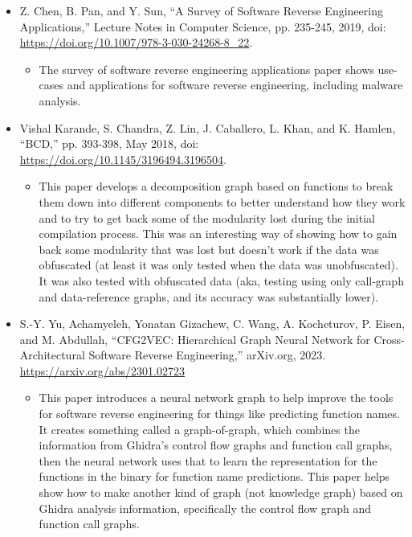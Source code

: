 \documentclass[12pt, a4paper]{article}
\begin{document}
    \begin{itemize}
        \item Z. Chen, B. Pan, and Y. Sun, “A Survey of Software Reverse Engineering Applications,” Lecture Notes in Computer Science, 
        pp. 235-245, 2019, doi: \url{https://doi.org/10.1007/978-3-030-24268-8\_22}. 
        \begin{itemize}
            \item The survey of software reverse engineering applications paper shows use-cases and applications for software reverse engineering, 
            including malware analysis.
        \end{itemize}
    \end{itemize}
    \begin{itemize}
        \item Vishal Karande, S. Chandra, Z. Lin, J. Caballero, L. Khan, and K. Hamlen, “BCD,” pp. 393-398, May 2018, doi: \url{https://doi.org/10.1145/3196494.3196504}. 
        \begin{itemize}
            \item This paper develops a decomposition graph based on functions to break them down into different components 
            to better understand how they work and to try to get back some of the modularity lost during the initial compilation process. 
            This was an interesting way of showing how to gain back some modularity that was lost but doesn't work if the data was obfuscated 
            (at least it was only tested when the data was unobfuscated). It was also tested with obfuscated data 
            (aka, testing using only call-graph and data-reference graphs, and its accuracy was substantially lower). 
        \end{itemize}
    \end{itemize}
    \begin{itemize}
        \item S.-Y. Yu, Achamyeleh, Yonatan Gizachew, C. Wang, A. Kocheturov, P. Eisen, and M. Abdullah, 
        “CFG2VEC: Hierarchical Graph Neural Network for Cross-Architectural Software Reverse Engineering,” arXiv.org, 2023. \url{https://arxiv.org/abs/2301.02723}
        \begin{itemize}
            \item This paper introduces a neural network graph to help improve the tools for software reverse engineering for things like predicting function names. 
            It creates something called a graph-of-graph, which combines the information from Ghidra's control flow graphs and function call graphs, 
            then the neural network uses that to learn the representation for the functions in the binary for function name predictions. 
            This paper helps show how to make another kind of graph (not knowledge graph) based on Ghidra analysis information, 
            specifically the control flow graph and function call graphs.
        \end{itemize}
    \end{itemize}
\end{document}
